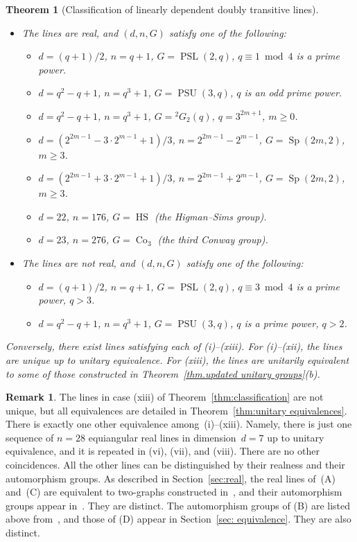 \documentclass[11pt]{article}
\newtheorem{theorem}[theo]{Theorem}
\theoremstyle{definition}
\newtheorem{remark}[theo]{Remark}
\numberwithin{equation}{section}
\begin{document}
\begin{theorem}[Classification of linearly dependent doubly transitive lines]
\begin{itemize}
	\begin{itemize}
	\item[(C)]
	The lines are real, and $(d,n,G)$ satisfy one of the following:
		\begin{itemize}
		\item[(v)]
		$d=(q+1)/2$, $n=q+1$, $G=\operatorname{PSL}(2,q)$, $q\equiv1\bmod4$ is a prime power.
		\item[(vi)]
		$d=q^2-q+1$, $n=q^3+1$, $G=\operatorname{PSU}(3,q)$, $q$ is an odd prime power. 
		\item[(vii)]
		$d=q^2-q+1$, $n=q^3+1$, $G={}^2G_2(q)$, $q=3^{2m+1}$, $m \geq 0$.
		\item[(viii)] 
		$d=(2^{2m-1}-3\cdot2^{m-1}+1)/3$, $n=2^{2m-1}-2^{m-1}$, $G=\operatorname{Sp}(2m,2)$, $m\geq3$.
		\item[(ix)]
		$d=(2^{2m-1}+3\cdot2^{m-1}+1)/3$, $n=2^{2m-1}+2^{m-1}$, $G=\operatorname{Sp}(2m,2)$, $m\geq3$.
		\item[(x)]
		$d=22$, $n=176$, $G=\operatorname{HS}$ (the Higman--Sims group).
		\item[(xi)]
		$d=23$, $n=276$, $G=\operatorname{Co}_3$ (the third Conway group).
		\end{itemize}
	
	\item[(D)]
	The lines are not real, and $(d,n,G)$ satisfy one of the following:
		\begin{itemize}
		\item[(xii)]
		$d=(q+1)/2$, $n=q+1$, $G=\operatorname{PSL}(2,q)$, $q\equiv3\bmod4$ is a prime power, $q > 3$.
		\item[(xiii)]
		$d=q^2-q+1$, $n=q^3+1$, $G=\operatorname{PSU}(3,q)$, $q$ is a prime power, $q > 2$.
		\end{itemize}
	\end{itemize}
\end{itemize}
Conversely, there exist lines satisfying each of (i)--(xiii).
For (i)--(xii), the lines are unique up to unitary equivalence.
For (xiii), the lines are unitarily equivalent to some of those constructed in Theorem~\ref{thm.updated unitary groups}(b).
\end{theorem}

\begin{remark}
\label{rem: coincidences}
The lines in case (xiii) of Theorem~\ref{thm:classification} are not unique, but all equivalences are detailed in Theorem~\ref{thm:unitary equivalences}.
There is exactly one other equivalence among~(i)--(xiii).
Namely, there is just one sequence of $n=28$ equiangular real lines in dimension~$d=7$ up to unitary equivalence, and it is repeated in (vi), (vii), and (viii).
There are no other coincidences.
All the other lines can be distinguished by their realness and their automorphism groups.
As described in Section~\ref{sec:real}, the real lines of~(A) and~(C) are equivalent to two-graphs constructed in~\cite{Taylor:77}, and their automorphism groups appear in~\cite{Taylor:92}.
They are distinct.
The automorphism groups of (B) are listed above from~\cite{DempwolffK:23}, and those of (D) appear in Section~\ref{sec: equivalence}.
They are also distinct.
\end{remark}
\end{document}

